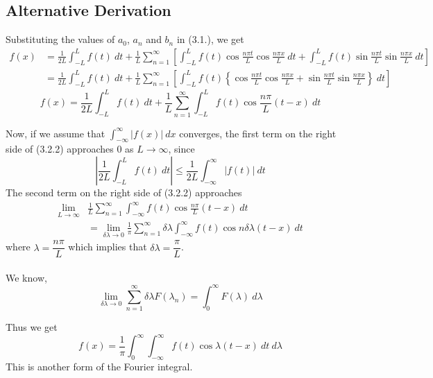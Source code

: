 \documentclass[12pt]{article}
\numberwithin{equation}{subsection}
\begin{document}
\subsection{Alternative Derivation}
Substituting the values of $a_0$, $a_n$ and $b_n$ in (3.1.), we get
\begin{align*}
    f(x) &= \frac{1}{2L} \int_{-L}^{L} {f(t)} \: d{t} + \frac{1}{L} \sum_{n=1}^{\infty} \left[ \int_{-L}^{L} {f(t) \cos{\frac{n\pi t}{L}} \cos{\frac{n\pi x}{L}}} \: d{t} + \int_{-L}^{L} {f(t) \sin{\frac{n\pi t}{L}} \sin{\frac{n\pi x}{L}}} \: d{t} \right] \\
    &= \frac{1}{2L} \int_{-L}^{L} {f(t)} \: d{t} + \frac{1}{L} \sum_{n=1}^{\infty} \left[ \int_{-L}^{L} {f(t) \left\{ \cos{\frac{n\pi t}{L}} \cos{\frac{n\pi x}{L}} + \sin{\frac{n\pi t}{L}} \sin{\frac{n\pi x}{L}} \right\}} \: d{t} \right]
\end{align*}
\begin{equation}
    f(x) = \frac{1}{2L} \int_{-L}^{L} {f(t)} \: d{t} + \frac{1}{L} \sum_{n=1}^{\infty} \int_{-L}^{L} {f(t) \cos{\frac{n\pi}{L}(t-x)}} \: d{t}
\end{equation}

Now, if we assume that $\displaystyle \int_{-\infty}^{\infty} {|f(x)|} \: d{x}$ converges, the first term on the right side of (3.2.2) approaches 0 as $L \to \infty$, since \[
    \left| \frac{1}{2L}\int_{-L}^{L} {f(t)} \: d{t} \right|  \le \frac{1}{2L}\int_{-\infty}^{\infty} {|f(t)|} \: d{t} 
\]
The second term on the right side of (3.2.2) approaches
\begin{align*}
    \lim_{L \to \infty} &\frac{1}{L} \sum_{n=1}^{\infty} { \int_{-\infty}^{\infty} {f(t) \cos{\frac{n\pi}{L}(t-x)}} \: d{t} }\\
    &= \lim_{\delta\lambda \to 0} \frac{1}{\pi} \sum_{n=1}^{\infty} \delta\lambda \int_{-\infty}^{\infty} { f(t) \cos{n\delta\lambda (t-x)} } \: d{t}
\end{align*}
where $\lambda = \dfrac{n\pi}{L}$ which implies that $\delta\lambda = \dfrac{\pi}{L}$.\\~\\

We know, \[
    \lim_{\delta\lambda \to 0} \sum_{n=1}^{\infty} \delta\lambda F(\lambda_n) = \int_{0}^{\infty} {F(\lambda)} \: d{\lambda}
\]

Thus we get
\begin{equation}
    \boxed{ f(x) = \frac{1}{\pi} \int_{0}^{\infty} \int_{-\infty}^{\infty} {f(t)\cos{\lambda(t-x)}} \: d{t} \: d{\lambda} }
\end{equation}
This is another form of the Fourier integral.
\end{document}
